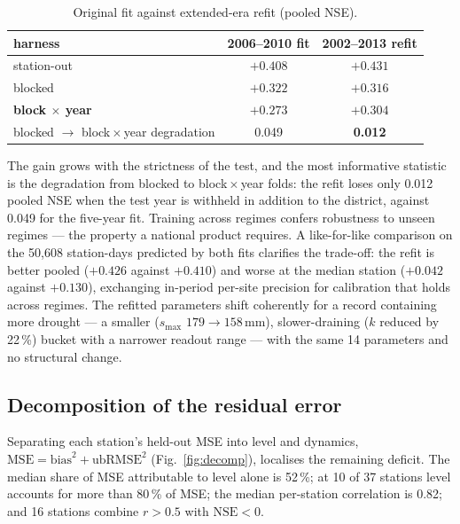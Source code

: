 \documentclass[11pt,a4paper]{article}
\newcommand{\nse}{\mathrm{NSE}}
\newcommand{\ubrmse}{\mathrm{ubRMSE}}
\begin{document}
\begin{table}[htbp]
\centering
\caption{Original fit against extended-era refit (pooled NSE).}
\label{tab:extended}
\small
\begin{tabular}{lcc}
\toprule
harness & 2006--2010 fit & 2002--2013 refit \\
\midrule
station-out                & $+0.408$ & $\mathbf{+0.431}$ \\
blocked                    & $+0.322$ & $+0.316$ \\
\textbf{block $\times$ year} & $+0.273$ & $\mathbf{+0.304}$ \\
blocked $\to$ block\,$\times$\,year degradation & 0.049 & \textbf{0.012} \\
\bottomrule
\end{tabular}
\end{table}

The gain grows with the strictness of the test, and the most informative
statistic is the degradation from blocked to block\,$\times$\,year folds: the
refit loses only 0.012 pooled NSE when the test year is withheld in addition
to the district, against 0.049 for the five-year fit. Training across regimes
confers robustness to unseen regimes --- the property a national product
requires. A like-for-like comparison on the 50{,}608 station-days predicted by
both fits clarifies the trade-off: the refit is better pooled ($+0.426$
against $+0.410$) and worse at the median station ($+0.042$ against $+0.130$),
exchanging in-period per-site precision for calibration that holds across
regimes. The refitted parameters shift coherently for a record containing more
drought --- a smaller ($s_{\max}$ $179 \to 158$\,mm), slower-draining ($k$
reduced by 22\,\%) bucket with a narrower readout range --- with the same 14
parameters and no structural change.

\subsection{Decomposition of the residual error}\label{sec:decomp}

Separating each station's held-out MSE into level and dynamics,
$\mathrm{MSE} = \mathrm{bias}^2 + \ubrmse^2$ (Fig.~\ref{fig:decomp}),
localises the remaining deficit. The median share of MSE attributable to level
alone is 52\,\%; at 10 of 37 stations level accounts for more than 80\,\% of
MSE; the median per-station correlation is 0.82; and 16 stations combine
$r > 0.5$ with $\nse < 0$.
\end{document}
